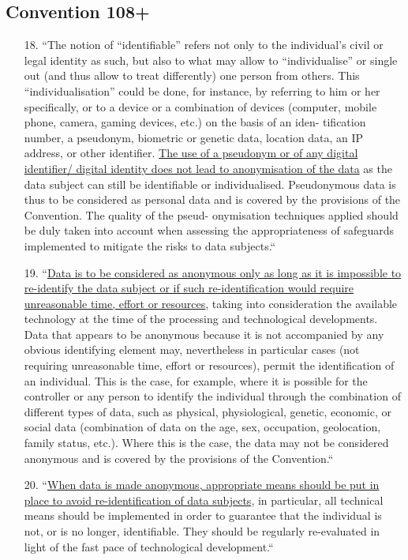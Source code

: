 \documentclass[aps,prb,twocolumn,superscriptaddress,floatfix,longbibliography,nofootinbib]{revtex4-2}
\begin{document}
  \subsection{\label{subsec:Conv108}Convention 108+}
    \begin{enumerate}
      \item[18.] ``The notion of “identifiable” refers not only to the
    individual’s civil or legal identity as such, but also to
    what may allow to “individualise” or single out (and
    thus allow to treat differently) one person from others.
    This “individualisation” could be done, for instance, by
    referring to him or her specifically, or to a device or
    a combination of devices (computer, mobile phone,
    camera, gaming devices, etc.) on the basis of an iden-
    tification number, a pseudonym, biometric or genetic
    data, location data, an IP address, or other identifier.
    \ul{The use of a pseudonym or of any digital identifier/
    digital identity does not lead to anonymisation of 
  the data} as the data subject can still be identifiable
    or individualised. Pseudonymous data is thus to be
    considered as personal data and is covered by the
    provisions of the Convention. The quality of the pseud-
    onymisation techniques applied should be duly taken
    into account when assessing the appropriateness of
    safeguards implemented to mitigate the risks to data
    subjects.``

  \item[19.] ``\ul{Data is to be considered as anonymous only as
    long as it is impossible to re-identify the data subject
    or if such re-identification would require unreasonable
  time, effort or resources}, taking into consideration the
    available technology at the time of the processing
    and technological developments. Data that appears
    to be anonymous because it is not accompanied by
    any obvious identifying element may, nevertheless
    in particular cases (not requiring unreasonable time,
    effort or resources), permit the identification of an
    individual. This is the case, for example, where it is
    possible for the controller or any person to identify
    the individual through the combination of different
    types of data, such as physical, physiological, genetic,
    economic, or social data (combination of data on the
    age, sex, occupation, geolocation, family status, etc.).
    Where this is the case, the data may not be considered
    anonymous and is covered by the provisions of the
    Convention.``

  \item[20.] ``\ul{When data is made anonymous, appropriate
    means should be put in place to avoid re-identification
  of data subjects}, in particular, all technical means
    should be implemented in order to guarantee that
    the individual is not, or is no longer, identifiable. They
    should be regularly re-evaluated in light of the fast
    pace of technological development.``\cite{Conv108+}
    \end{enumerate}
    
\end{document}
